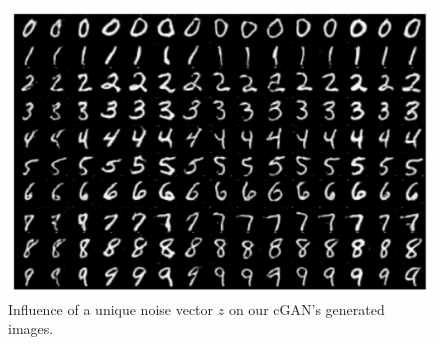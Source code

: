 \begin{figure}[H]
    \centering
    \includegraphics[width=.8\textwidth]{impact_of_z}
    \caption{Influence of a unique noise vector $z$ on our cGAN's generated images.}
    \label{fig:impact_of_z}
\end{figure}